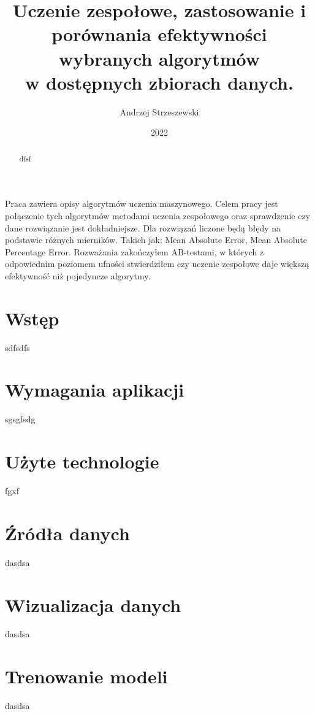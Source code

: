 \documentclass[wmii, inf, mgr]{uwmthesis}
\date{2022}
\title{Uczenie zespołowe, zastosowanie i porównania efektywności wybranych algorytmów\\ w dostępnych zbiorach danych.}
\author{Andrzej Strzeszewski}
\begin{document}
\maketitle





\begin{streszczenie}
Praca zawiera opisy algorytmów uczenia maszynowego. Celem pracy jest połączenie tych algorytmów  metodami uczenia zespołowego oraz sprawdzenie czy dane rozwiązanie jest dokładniejsze. Dla rozwiązań liczone będą błędy na podstawie różnych mierników. Takich jak: Mean Absolute Error, Mean Absolute Percentage Error. Rozważania zakończyłem AB-testami, w których z odpowiednim poziomem ufności stwierdziłem czy uczenie zespołowe daje większą efektywność niż pojedyncze algorytmy.  

\end{streszczenie}

\begin{abstract}
dfsf 

\end{abstract}


\tableofcontents

\chapter*{Wstęp}

sdfsdfs

\chapter{Wymagania aplikacji}

sgsgfsdg

\chapter{Użyte technologie}

fgxf

\chapter{Źródła danych }
dasdsa

\chapter{Wizualizacja danych }
dasdsa

\chapter{Trenowanie modeli }
dasdsa
\end{document}
